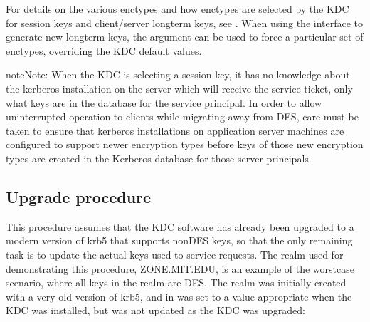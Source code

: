 \documentclass[letterpaper,10pt,english]{sphinxmanual}
\begin{document}
\sphinxAtStartPar
For details on the various enctypes and how enctypes are selected by the KDC
for session keys and client/server long\sphinxhyphen{}term keys, see {\hyperref[\detokenize{admin/enctypes:enctypes}]{}}.
When using the {\hyperref[\detokenize{admin/admin_commands/kadmin_local:kadmin-1}]{}} interface to generate new long\sphinxhyphen{}term keys,
the  argument can be used to force a particular set of enctypes,
overriding the KDC default values.

\begin{sphinxadmonition}{note}{Note:}
\sphinxAtStartPar
When the KDC is selecting a session key, it has no knowledge about the
kerberos installation on the server which will receive the service ticket,
only what keys are in the database for the service principal.
In order to allow uninterrupted operation to
clients while migrating away from DES, care must be taken to ensure that
kerberos installations on application server machines are configured to
support newer encryption types before keys of those new encryption types
are created in the Kerberos database for those server principals.
\end{sphinxadmonition}


\subsection{Upgrade procedure}
\label{\detokenize{admin/advanced/retiring-des:upgrade-procedure}}
\sphinxAtStartPar
This procedure assumes that the KDC software has already been upgraded
to a modern version of krb5 that supports non\sphinxhyphen{}DES keys, so that the
only remaining task is to update the actual keys used to service requests.
The realm used for demonstrating this procedure, ZONE.MIT.EDU,
is an example of the worst\sphinxhyphen{}case scenario, where all keys in the realm
are DES.  The realm was initially created with a very old version of krb5,
and  in {\hyperref[\detokenize{admin/conf_files/kdc_conf:kdc-conf-5}]{}} was set to a value
appropriate when the KDC was installed, but was not updated as the KDC
was upgraded:

\begin{sphinxVerbatim}[commandchars=\\\{\}]
\PYG{p}{[}\PYG{p}{]}
          
                \PYG{p}{[}\PYG{p}{]}
                  
                       
\end{sphinxVerbatim}
\end{document}
